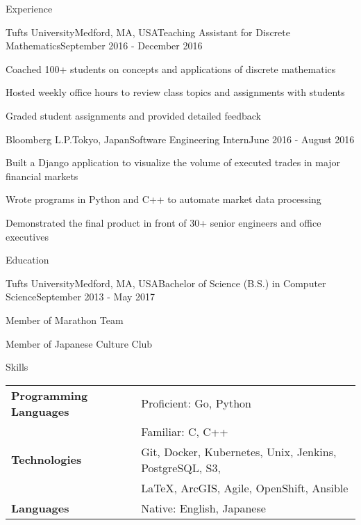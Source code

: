 \documentclass{resume}
\begin{document}
\begin{rSection}{Experience}
    \begin{rSubsection}{Tufts University}{Medford, MA, USA}{Teaching Assistant for Discrete Mathematics}{September 2016 - December 2016}{}{}
    \item Coached 100+ students on concepts and applications of discrete mathematics
    \item Hosted weekly office hours to review class topics and assignments with students
    \item Graded student assignments and provided detailed feedback
    \end{rSubsection}
    
    \begin{rSubsection}{Bloomberg L.P.}{Tokyo, Japan}{Software Engineering Intern}{June 2016 - August 2016}{}{}
    \item Built a Django application to visualize the volume of executed trades in major financial markets
    \item Wrote programs in Python and C++ to automate market data processing
    \item Demonstrated the final product in front of 30+ senior engineers and office executives
    \end{rSubsection}
  
  \end{rSection}

  \begin{rSection}{Education}
    \begin{rSubsection}{Tufts University}{Medford, MA, USA}{Bachelor of Science (B.S.) in Computer Science}{September 2013 - May 2017}{}{}
      \item Member of Marathon Team
      \item Member of Japanese Culture Club
      \end{rSubsection}
  \end{rSection}
  
  \begin{rSection}{Skills}
    \begin{tabular}{ @{} >{\bfseries}l @{\hspace{6ex}} l }
      Programming Languages & Proficient: Go, Python \\
      & Familiar: C, C++ \\
      Technologies & Git, Docker, Kubernetes, Unix, Jenkins, PostgreSQL, S3,\\
      & LaTeX, ArcGIS, Agile, OpenShift, Ansible \\
      Languages & Native: English, Japanese 
    \end{tabular}
  \end{rSection}
\end{document}
